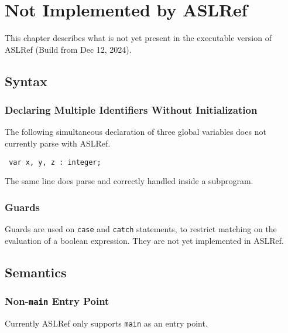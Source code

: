 \chapter{Not Implemented by ASLRef\label{appendix:UnimplementedInASLRef}}

This chapter describes what is not yet present in the executable version of ASLRef
(Build from Dec 12, 2024).

\section{Syntax}

\subsection{Declaring Multiple Identifiers Without Initialization}
The following simultaneous declaration of three global variables does not currently parse with ASLRef.
\begin{verbatim}
 var x, y, z : integer;
\end{verbatim}

The same line does parse and correctly handled inside a subprogram.


\subsection{Guards}

Guards are used on \texttt{case} and \texttt{catch} statements, to restrict
matching on the evaluation of a boolean expression.
%
They are not yet implemented in ASLRef.

\section{Semantics}

\subsection{Non-\texttt{main} Entry Point}
Currently ASLRef only supports \texttt{main} as an entry point.

